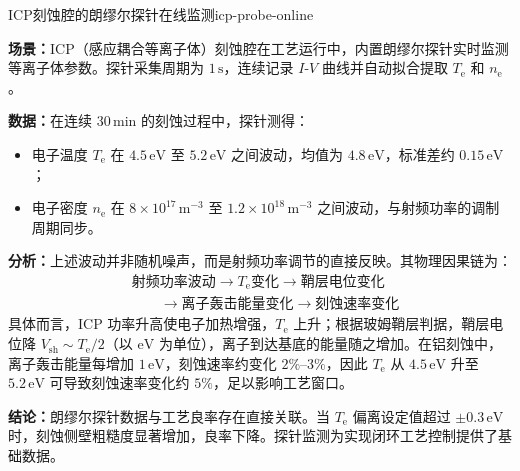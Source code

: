 \documentclass[12pt,a4paper,openany,oneside]{book}
\newcommand{\ee}{\mathrm{e}}
\newcommand{\difficulty}[1]{\marginnote{\hfill\textcolor{coverMid!80}{\rule[-0.1em]{2pt}{0.9em}}\,\textcolor{coverMid}{\footnotesize\textbf{[#1]}}}}
\begin{document}
\begin{example}{ICP刻蚀腔的朗缪尔探针在线监测}{icp-probe-online}
\difficulty{提高}

\textbf{场景：}ICP（感应耦合等离子体）刻蚀腔在工艺运行中，内置朗缪尔探针实时监测等离子体参数。探针采集周期为 $1\,\mathrm{s}$，连续记录 $I$-$V$ 曲线并自动拟合提取 $T_\ee$ 和 $n_\ee$。

\textbf{数据：}在连续 $30\,\mathrm{min}$ 的刻蚀过程中，探针测得：
\begin{itemize}
\item 电子温度 $T_\ee$ 在 $4.5\,\mathrm{eV}$ 至 $5.2\,\mathrm{eV}$ 之间波动，均值为 $4.8\,\mathrm{eV}$，标准差约 $0.15\,\mathrm{eV}$；
\item 电子密度 $n_\ee$ 在 $8\times 10^{17}\,\mathrm{m}^{-3}$ 至 $1.2\times 10^{18}\,\mathrm{m}^{-3}$ 之间波动，与射频功率的调制周期同步。
\end{itemize}

\textbf{分析：}上述波动并非随机噪声，而是射频功率调节的直接反映。其物理因果链为：
\[
\begin{aligned}
&\text{射频功率波动} \longrightarrow T_\ee\text{变化} \longrightarrow \text{鞘层电位变化} \\
&\qquad \longrightarrow \text{离子轰击能量变化} \longrightarrow \text{刻蚀速率变化}
\end{aligned}
\]
具体而言，ICP 功率升高使电子加热增强，$T_\ee$ 上升；根据玻姆鞘层判据，鞘层电位降 $V_\mathrm{sh} \sim T_\ee/2$（以 $\mathrm{eV}$ 为单位），离子到达基底的能量随之增加。在铝刻蚀中，离子轰击能量每增加 $1\,\mathrm{eV}$，刻蚀速率约变化 $2\%\text{--}3\%$，因此 $T_\ee$ 从 $4.5\,\mathrm{eV}$ 升至 $5.2\,\mathrm{eV}$ 可导致刻蚀速率变化约 $5\%$，足以影响工艺窗口。

\textbf{结论：}朗缪尔探针数据与工艺良率存在直接关联。当 $T_\ee$ 偏离设定值超过 $\pm 0.3\,\mathrm{eV}$ 时，刻蚀侧壁粗糙度显著增加，良率下降。探针监测为实现闭环工艺控制提供了基础数据。
\end{example}
\end{document}
